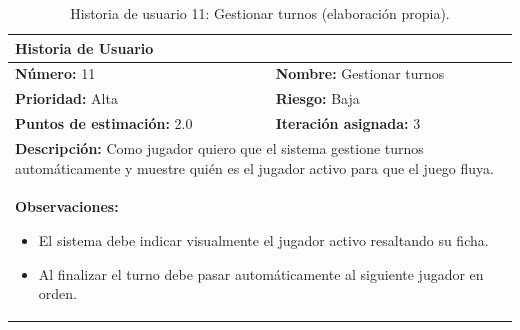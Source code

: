 \begin{table}[H]
\centering
\caption{Historia de usuario 11: Gestionar turnos (elaboración propia).\label{tab:hu11}}
\renewcommand{\arraystretch}{1.5}
\begin{tabular}{|p{}|p{}|}
\hline
\multicolumn{2}{|l|}{\textbf{Historia de Usuario}} \\
\hline
\textbf{Número:} 11 & \textbf{Nombre:} Gestionar turnos \\
\hline
\textbf{Prioridad:} Alta & \textbf{Riesgo:} Baja \\
\hline
\textbf{Puntos de estimación:} 2.0 & \textbf{Iteración asignada:} 3 \\
\hline
\multicolumn{2}{|p{0.945\textwidth}|}{\textbf{Descripción:} Como jugador quiero que el sistema gestione turnos automáticamente y muestre quién es el jugador activo para que el juego fluya.} \\
\hline
\multicolumn{2}{|p{0.945\textwidth}|}{\textbf{Observaciones:}
\vspace{-0.5em}
\begin{itemize}
    \setlength\itemsep{0em}
    \item El sistema debe indicar visualmente el jugador activo resaltando su ficha.
    \item Al finalizar el turno debe pasar automáticamente al siguiente jugador en orden.
\end{itemize}
\vspace{-1em}
} \\
\hline
\end{tabular}
\end{table}

